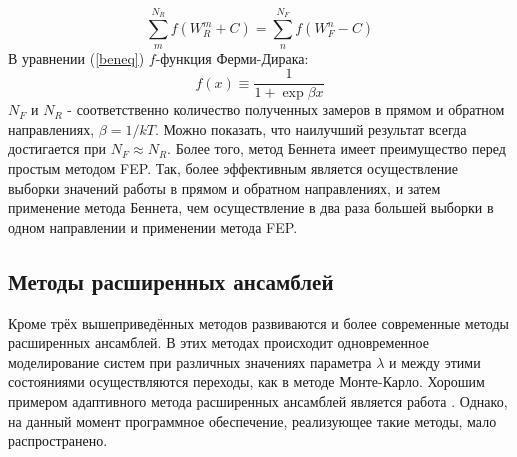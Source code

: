 \begin{equation}
\label{beneq}
\sum _m^{N_R} f(W_R^m+C)=\sum _n^{N_F} f(W_F^n-C)
\end{equation}
В уравнении (\ref{beneq}) $f$-функция Ферми-Дирака:
$$
f(x)\equiv \frac{1}{1+\exp{\beta x}}
$$
$N_F$ и $N_R$ - соответственно количество полученных замеров в прямом и обратном направлениях, $\beta=1/kT$. Можно показать, что наилучший результат всегда достигается при $N_F\approx N_R$. Более того, метод Беннета имеет преимущество перед простым методом FEP. Так, более эффективным является осуществление выборки значений работы в прямом и обратном направлениях, и затем применение метода Беннета, чем осуществление в два раза большей выборки в одном направлении и применении метода FEP.

\subsection{Методы расширенных ансамблей}
Кроме трёх вышеприведённых методов развиваются и более современные методы расширенных ансамблей. В этих методах происходит одновременное моделирование систем при различных значениях параметра $\lambda$ и между этими состояниями осуществляются переходы, как в методе Монте-Карло. Хорошим примером адаптивного метода расширенных ансамблей является работа \cite{lyubartsev_2004}. Однако, на данный момент программное обеспечение, реализующее такие методы, мало распространено.
